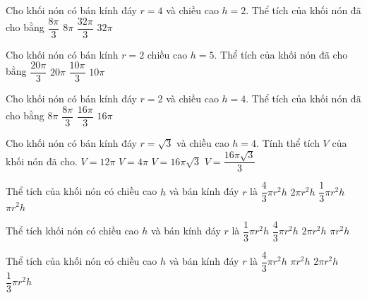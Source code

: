 \begin{ex}
	[Mã 102 - 2020 Lần 1]%
	Cho khối nón có bán kính đáy $r=4$ và chiều cao $h=2$. Thể tích của khối nón đã cho bằng
	\choice
	{$\dfrac{8 \pi}{3}$}
	{$8 \pi$}
	{\True $\dfrac{32 \pi}{3}$}
	{$32 \pi$}
\end{ex}
\begin{ex}
	[Mã 103 - 2020 Lần 1]%
	Cho khối nón có bán kính $r=2$ chiều cao $h=5$. Thể tích của khối nón đã cho bằng
	\choice
	{\True $\dfrac{20\pi}{3}$}
	{$20\pi$}
	{$\dfrac{10\pi}{3}$}
	{$10\pi$}
\end{ex}
\begin{ex}
	[Mã 104 - 2020 Lần 1]%
	Cho khối nón có bán kính đáy $r=2$ và chiều cao $h=4$. Thể tích của khối nón đã cho bằng
	\choice
	{$8\pi$}
	{$\dfrac{8\pi}{3}$}
	{\True $\dfrac{16\pi}{3}$}
	{$16\pi$}
\end{ex}
\begin{ex}
	[Mã 110 2017]%
	Cho khối nón có bán kính đáy $r=\sqrt{3}$ và chiều cao $h=4$. Tính thể tích $V$ của khối nón đã cho. 
	\choice
	{$V=12\pi$}
	{\True $V=4\pi$}
	{$V=16\pi\sqrt{3}$}
	{$V=\dfrac{16\pi\sqrt{3}}{3}$}
\end{ex}
\begin{ex}
	[Mã 101 - 2019]%
	Thể tích của khối nón có chiều cao $h$ và bán kính đáy $r$ là
	\choice
	{$\dfrac{4}{3}\pi r^2h$}
	{$2\pi r^2h$}
	{\True $\dfrac{1}{3}\pi r^2h$}
	{$\pi r^2h$}
\end{ex}
\begin{ex}
	[Mã 104 2019]%
	Thể tích khối nón có chiều cao $h$ và bán kính đáy $r$ là
	\choice
	{\True $\dfrac{1}{3}\pi r^2h$}
	{$\dfrac{4}{3}\pi r^2h$}
	{$2\pi r^2h$}
	{$\pi r^2h$}
\end{ex}
\begin{ex}
	[Mã 102 - 2019]%
	Thể tích của khối nón có chiều cao $h$ và bán kính đáy $r$ là
	\choice
	{$\dfrac{4}{3}\pi r^2h$}
	{$\pi r^2h$}
	{$2\pi r^2h$}
	{\True $\dfrac{1}{3}\pi r^2h$}
\end{ex}

